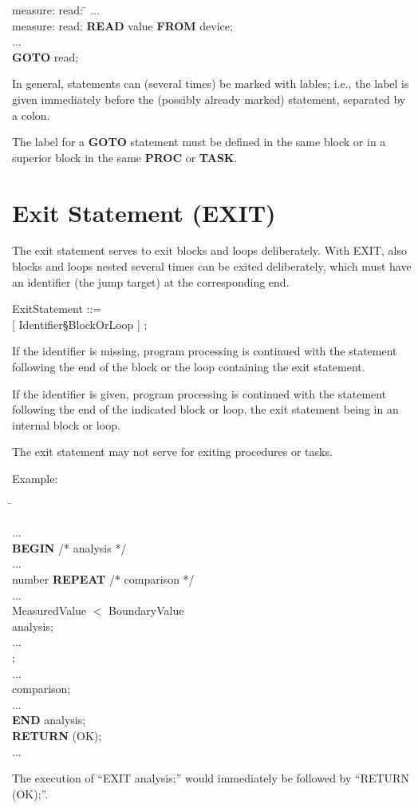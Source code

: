 \begin{tabbing}
measure: read: \= \kill
        \> ...\\
measure: read: \> {\bf READ} value {\bf FROM} device;\\
        \> ... \\
        \> {\bf GOTO} read;
\end{tabbing}

In general, statements can (several times) be marked with lables; i.e.,
the label is given immediately before the (possibly already marked)
statement, separated by a colon.

\begin{added}
The label for a {\bf GOTO} statement must be defined in the same block or in a superior block 
in the same {\bf PROC} or {\bf TASK}.
\end{added}

\section{Exit Statement (EXIT)}    %

The exit statement serves to exit blocks and loops deliberately. With
EXIT, also blocks and loops nested several times can be exited
deliberately, which must have an identifier (the jump target) at the
corresponding end.

ExitStatement ::= \\
 [ Identifier\S BlockOrLoop ] ;

If the identifier is missing, program processing is continued with the
statement following the end of the block or the loop containing the exit
statement.

If the identifier is given, program processing is continued with the
statement following the end of the indicated block or loop, the exit
statement being in an internal block or loop.

The exit statement may not serve for exiting procedures or tasks.

Example:

\begin{tabbing}
\hspace*{7cm} \= \kill

... \> \\
{\bf BEGIN} \> /* analysis */ \\
\x ... \> \\
 number {\bf REPEAT} \> /* comparison */ \\
\x \x ... \> \\
\x {} MeasuredValue $<$ BoundaryValue \> \\
\x {} analysis; \> \\
\x {} ... \> \\
\x {}; \> \\
\x \x ... \> \\
 comparison; \> \\
\x ... \> \\
{\bf END} analysis; \> \\
{\bf RETURN} (OK);\> \\
\x ... \>
\end{tabbing}

The execution of ``EXIT analysis;'' would immediately be followed by
``RETURN (OK);''.

